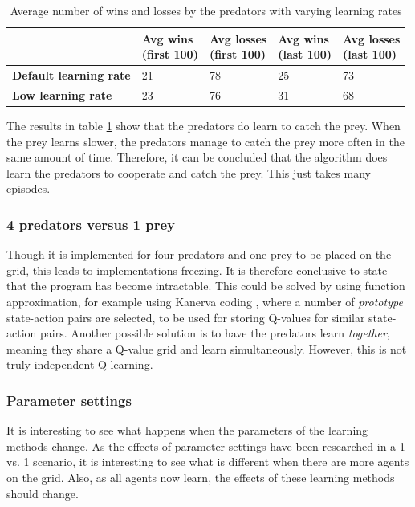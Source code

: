 \begin{table}[H]
\begin{center}
\begin{tabular}{| l | l | l | l | l |}
\hline
 & \parbox{2cm}{\textbf{Avg wins \\ (first 100)}} & \parbox{2cm}{\textbf{Avg losses \\ (first 100)}} & \parbox{2cm}{\textbf{Avg wins \\ (last 100)}} & \parbox{2cm}{\textbf{Avg losses \\ (last 100)}} \\
\hline
\textbf{Default learning rate} & 21 & 78 & 25 & 73 \\
\hline
\textbf{Low learning rate} & 23 & 76 & 31 & 68 \\
\hline
\end{tabular}
\caption{Average number of wins and losses by the predators with varying learning rates}
\label{table:3vs1}
\end{center}
\end{table}

The results in table \ref{table:3vs1} show that the predators do learn to catch the prey. When the prey learns slower, the predators manage to catch the prey more often in the same amount of time. Therefore, it can be concluded that the algorithm does learn the predators to cooperate and catch the prey. This just takes many episodes.

\subsubsection{4 predators versus 1 prey} \label{sec:intractable}
Though it is implemented for four predators and one prey to be placed on the grid, this leads to implementations freezing. It is therefore conclusive to state that the program has become intractable. This could be solved by using function approximation, for example using Kanerva coding \cite{wu2009function}, where a number of \textit{prototype} state-action pairs are selected, to be used for storing Q-values for similar state-action pairs. Another possible solution is to have the predators learn \textit{together}, meaning they share a Q-value grid and learn simultaneously. However, this is not truly independent Q-learning. 

\subsubsection{Parameter settings}
It is interesting to see what happens when the parameters of the learning methods change. As the effects of parameter settings have been researched in a 1 vs. 1 scenario, it is interesting to see what is different when there are more agents on the grid. Also, as all agents now learn, the effects of these learning methods should change.


